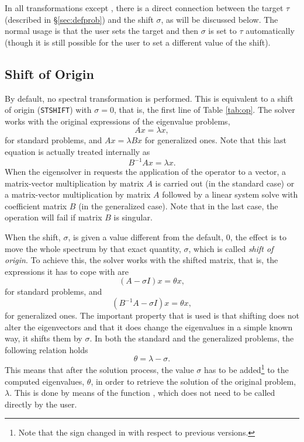 	In all transformations except , there is a direct connection between the target $\tau$ (described in \S\ref{sec:defprob}) and the shift $\sigma$, as will be discussed below. The normal usage is that the user sets the target and then $\sigma$ is set to $\tau$ automatically (though it is still possible for the user to set a different value of the shift).

\subsection{Shift of Origin}

	By default, no spectral transformation is performed. This is equivalent to a shift of origin (\texttt{STSHIFT}) with $\sigma=0$, that is, the first line of Table \ref{tab:op}. The solver works with the original expressions of the eigenvalue problems,
\begin{equation}Ax=\lambda x,\end{equation}
for standard problems, and $Ax=\lambda Bx$ for generalized ones. Note that this last equation is actually treated internally as
\begin{equation}B^{-1}Ax=\lambda x.\end{equation}
When the eigensolver in  requests the application of the operator to a vector, a matrix-vector multiplication by matrix $A$ is carried out (in the standard case) or a matrix-vector multiplication by matrix $A$ followed by a linear system solve with coefficient matrix $B$ (in the generalized case). Note that in the last case, the operation will fail if matrix $B$ is singular.

When the shift, $\sigma$, is given a value different from the default, 0, the effect is to move the whole spectrum by that exact quantity, $\sigma$, which is called \emph{shift of origin}. To achieve this, the solver works with the shifted matrix, that is, the expressions it has to cope with are
\begin{equation}(A-\sigma I)x=\theta x,\end{equation}
for standard problems, and
\begin{equation}(B^{-1}A-\sigma I) x=\theta x,\end{equation}
for generalized ones. The important property that is used is that shifting does not alter the eigenvectors and that it does change the eigenvalues in a simple known way, it shifts them by $\sigma$. In both the standard and the generalized problems, the following relation holds
\begin{equation}\theta=\lambda-\sigma.\end{equation}
This means that after the solution process, the value $\sigma$ has to be added\footnote{Note that the sign changed in  with respect to previous versions.} to the computed eigenvalues, $\theta$, in order to retrieve the solution of the original problem, $\lambda$. This is done by means of the function , which does not need to be called directly by the user.

